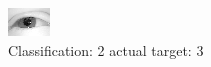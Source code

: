 \begin{figure}[h!]
\begin{center}
\includegraphics[width=0.60\columnwidth]{figures/ID2399_class_2_target_3.png}
\end{center}
\caption{ Classification: 2 actual target: 3}
\label{fig:ID2399_class_2_target_3}
\end{figure}
